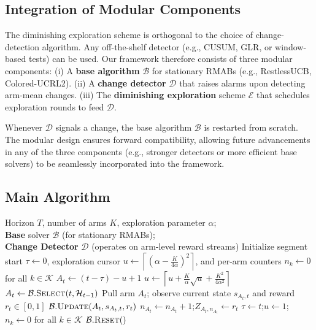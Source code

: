 \documentclass[twoside]{article}
\theoremstyle{plain}
\theoremstyle{definition}
\theoremstyle{remark}
\begin{document}
\subsection{Integration of Modular Components}
The diminishing exploration scheme is orthogonal to the choice of 
change-detection algorithm. 
Any off-the-shelf detector (e.g., CUSUM, GLR, or window-based tests) 
can be used. 
Our framework therefore consists of three modular components:
(i) A \textbf{base algorithm} $\mathcal{B}$ for stationary RMABs (e.g., RestlessUCB, Colored-UCRL2).
(ii) A \textbf{change detector} $\mathcal{D}$ that raises alarms upon detecting arm-mean changes.
(iii) The \textbf{diminishing exploration} scheme $\mathcal{E}$ that schedules exploration rounds to feed $\mathcal{D}$.

Whenever $\mathcal{D}$ signals a change, the base algorithm $\mathcal{B}$ 
is restarted from scratch. 
The modular design ensures forward compatibility, allowing future advancements in any of the three components (e.g., stronger detectors or more efficient base solvers) to be seamlessly incorporated into the framework.


\subsection{Main Algorithm}

\begin{algorithm}[ht]
    \caption{CD-RMAB with Diminishing Exploration (Modular)}\label{alg:main_alg}
    \begin{algorithmic}[1]
        \REQUIRE Horizon $T$, number of arms $K$, exploration parameter $\alpha$; \\
                 \textbf{Base} solver $\mathcal{B}$ (for stationary RMABs); \\
                 \textbf{Change Detector} $\mathcal{D}$ (operates on arm-level reward streams)
        \STATE Initialize segment start $\tau \gets 0$, exploration cursor $u \gets \left\lceil\left(\alpha-\frac{K}{4\alpha}\right)^{2}\right\rceil$, and per-arm counters $n_k \gets 0$ for all $k \in \mathcal{K}$
                \STATE $A_t \gets (t-\tau) - u + 1$
            \ELSE
                    \STATE $u \gets \left\lceil u + \frac{K}{\alpha}\sqrt{u} + \frac{K^{2}}{4\alpha^{2}} \right\rceil$
                \ENDIF
                \STATE $A_t \gets \mathcal{B}.\textsc{Select}(t, \mathcal{H}_{t-1})$ 
            \ENDIF
            \STATE Pull arm $A_t$; observe current state $s_{A_t,t}$ and reward $r_t \in [0,1]$
            \STATE $\mathcal{B}.\textsc{Update}(A_t, s_{A_t,t}, r_t)$ 
            \STATE $n_{A_t} \gets n_{A_t} + 1$;\quad $Z_{A_t, n_{A_t}} \gets r_t$ 
                \STATE $\tau \gets t$;\quad $u \gets 1$;\quad $n_k \gets 0$ for all $k \in \mathcal{K}$
                \STATE $\mathcal{B}.\textsc{Reset}()$ 
            \ENDIF
        \ENDFOR
    \end{algorithmic}
\end{algorithm}
\end{document}
